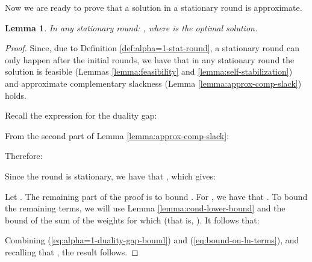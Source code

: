 \documentclass[11pt]{article}
\newtheorem{lemma}[theorem]{Lemma}
\begin{document}
Now we are ready to prove that a solution in a stationary round is approximate.
\begin{lemma}\label{lemma:alpha=1-stat-round}
In any stationary round: , where  is the optimal solution.
\end{lemma}
\begin{proof}
Since, due to Definition \ref{def:alpha=1-stat-round}, a stationary round can only happen after the initial  rounds, we have that in any stationary round the solution is feasible (Lemmas \ref{lemma:feasibility} and \ref{lemma:self-stabilization}) and approximate complementary slackness (Lemma \ref{lemma:approx-comp-slack}) holds. 

Recall the expression \iffalse(\ref{eq:duality-gap-proportional})\fi for the duality gap:

From the second part of Lemma \ref{lemma:approx-comp-slack}:

Therefore:

Since the round is stationary, we have that , which gives:

Let . The remaining part of the proof is to bound . 
For , we have that . To bound the remaining terms, we will use Lemma \ref{lemma:cond-lower-bound} and the bound of the sum of the weights  for which  (that is, ). It follows that:

Combining (\ref{eq:alpha=1-duality-gap-bound}) and (\ref{eq:bound-on-ln-terms}), and recalling that , the result follows.
\end{proof}
\end{document}
